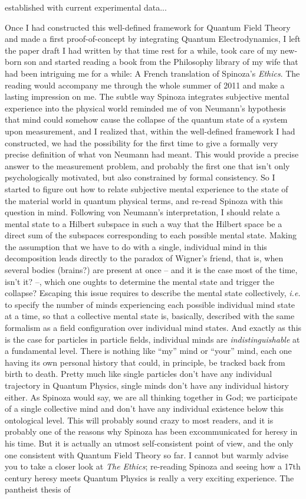 established with current experimental data...

Once I had constructed this well-defined framework for Quantum Field Theory and made a first proof-of-concept by integrating Quantum Electrodynamics, I left the paper draft I had written by that time rest for a while, took care of my new-born son and started reading a book from the Philosophy library of my wife that had been intriguing me for a while: A French translation of Spinoza's \textit{Ethics}. The reading would accompany me through the whole summer of 2011 and make a lasting impression on me. The subtle way Spinoza integrates subjective mental experience into the physical world reminded me of von Neumann's hypothesis that mind could somehow cause the collapse of the quantum state of a system upon measurement, and I realized that, within the well-defined framework I had constructed, we had the possibility for the first time to give a formally very precise definition of what von Neumann had meant. This would provide a precise answer to the measurement problem, and probably the first one that isn't only psychologically motivated, but also constrained by formal consistency. So I started to figure out how to relate subjective mental experience to the state of the material world in quantum physical terms, and re-read Spinoza with this question in mind. Following von Neumann's interpretation, I should relate a mental state to a Hilbert subspace in such a way that the Hilbert space be a direct sum of the subspaces corresponding to each possible mental state. Making the assumption that we have to do with a single, individual mind in this decomposition leads directly to the paradox of Wigner's friend, that is, when several bodies (brains?) are present at once -- and it is the case most of the time, isn't it? --, which one oughts to determine the mental state and trigger the collapse? Escaping this issue requires to describe the mental state collectively, \textit{i.e.} to specify the number of minds experiencing each possible individual mind state at a time, so that a collective mental state is, basically, described with the same formalism as a field configuration over individual mind states. And exactly as this is the case for particles in particle fields, individual minds are \textit{indistinguishable} at a fundamental level. There is nothing like ``my'' mind or ``your'' mind, each one having its own personal history that could, in principle, be tracked back from birth to death. Pretty much like single particles don't have any individual trajectory in Quantum Physics, single minds don't have any individual history either. As Spinoza would say, we are all thinking together in God; we participate of a single collective mind and don't have any individual existence below this ontological level. This will probably sound crazy to most readers, and it is probably one of the reasons why Spinoza has been excommunicated for heresy in his time. But it is actually an utmost self-consistent point of view, and the only one consistent with Quantum Field Theory so far. I cannot but warmly advise you to take a closer look at \textit{The Ethics}; re-reading Spinoza and seeing how a 17th century heresy meets Quantum Physics is really a very exciting experience. The pantheist thesis of 